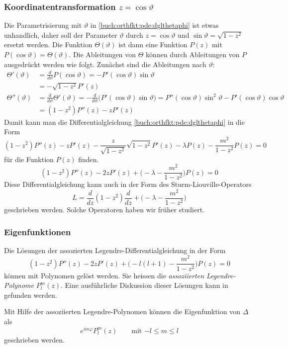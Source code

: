 %
%
\subsubsection{Koordinatentransformation $z=\cos\vartheta$}
Die Parametrisierung mit $\vartheta$
in \eqref{buch:orthfkt:pde:dglthetaphi}
ist etwas unhandlich, daher soll der Parameter
$\vartheta$ durch $z=\cos\vartheta$ und
$\sin\vartheta = \sqrt{1-z^2}$
ersetzt werden.
Die Funktion $\Theta(\vartheta)$ ist dann eine Funktion $P(z)$ mit
$P(\cos\vartheta)=\Theta(\vartheta)$.
Die Ableitungen von $\Theta$ können durch Ableitungen von $P$
ausgedrückt werden wie folgt.
Zunächst sind die Ableitungen nach $\vartheta$:
\begin{align*}
\Theta'(\vartheta)
&=
\frac{d}{d\vartheta} P(\cos\vartheta)
=
-P'(\cos\vartheta) \sin\vartheta
\\
&=
-
\sqrt{1-z^2}
P'(z)
\\
\Theta''(\vartheta)
&=
\frac{d}{d\vartheta} 
\Theta'(\vartheta)
=
-\frac{d}{d\vartheta}\bigl(P'(\cos\vartheta) \sin\vartheta\bigr)
=
P''(\cos\vartheta)\sin^2\vartheta
-
P'(\cos\vartheta)\cos\vartheta
\\
&=
(1-z^2)
P''(z)
-
z
P'(z)
\end{align*}
Damit kann man die Differentialgleichung
\eqref{buch:orthfkt:pde:dglthetaphi}
in die Form
\[
(1-z^2)P''(z)
-
zP'(z)
-
\frac{z}{\sqrt{1-z^2}}\sqrt{1-z^2}P'(z)
-
\lambda P(z)
-
\frac{m^2}{1-z^2}P(z)
=
0
\]
für die Funktion $P(z)$ finden.
\begin{equation}
(1-z^2)P''(z) - 2zP'(z)
+
\biggl(
-
\lambda
-
\frac{m^2}{1-z^2}
\biggr)
P(z)
=
0
\label{buch:orthofkt:pde:eqn:legendreassocz}
\end{equation}
Diese Differentialgleichung kann auch in der Form des
Sturm-Liouville-Operators
\[
L
=
\frac{d}{dz}
(1-z^2)
\frac{d}{dz}
+
\biggl(-\lambda-\frac{m^2}{1-z^2}\biggr)
\]
geschrieben werden.
Solche Operatoren haben wir früher studiert.

%
%
\subsubsection{Eigenfunktionen}
Die Lösungen der assozierten Legendre-Differentialgleichung
in der Form 
\[
(1-z^2)P''(z)
-2z P'(z) +
\biggl(
-l(l+1)-\frac{m^2}{1-z^2}
\biggr)P(z)
=
0
\]
können mit Polynomen gelöst werden.
Sie heissen die {\em assoziierten Legendre-Polynome} $P_l^m(z)$.
Eine ausführliche Diskussion dieser Lösungen kann in
\cite{buch:mathsem-spezfunk}
gefunden werden.

Mit Hilfe der assoziierten Legendre-Polynomen können die Eigenfunktion
von $\Delta$ als
\[
e^{im\varphi}
P_l^m(z)
\qquad\text{mit $-l\le m\le l$}
\]
geschrieben werden.



